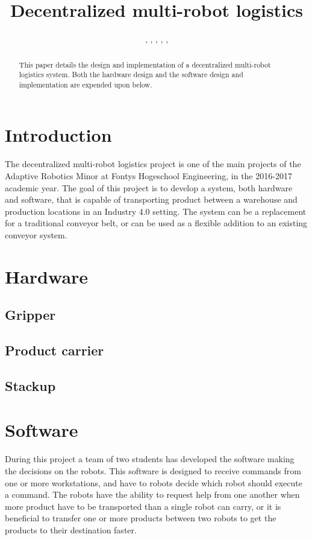 \documentclass[10pt, journal]{IEEEtran}
\author{\IEEEauthorblockN{Remco Aarts}, 
 \IEEEauthorblockN{Jeroen van den Akker}, 
 \IEEEauthorblockN{Robert Delmaar}, 
 \IEEEauthorblockN{Bas Janssen},
 \IEEEauthorblockN{Addie Perenboom},
 \IEEEauthorblockN{Dimitri Waard}}
\title{Decentralized multi-robot logistics}
\begin{document}
\maketitle

\begin{abstract}
This paper details the design and implementation of a decentralized multi-robot logistics system. Both the hardware design and the software design and implementation are expended upon below.
\end{abstract}
\begin{IEEEkeywords}

\end{IEEEkeywords}

\section{Introduction}
The decentralized multi-robot logistics project is one of the main projects of the Adaptive Robotics Minor at Fontys Hogeschool Engineering, in the 2016-2017 academic year. The goal of this project is to develop a system, both hardware and software, that is capable of transporting product between a warehouse and production locations in an Industry 4.0 setting. The system can be a replacement for a traditional conveyor belt, or can be used as a flexible addition to an existing conveyor system.

\section{Hardware}

\subsection{Gripper}
\lipsum[4]

\subsection{Product carrier}
\lipsum[5]

\subsection{Stackup}
\lipsum[7-8]

\section{Software}
During this project a team of two students has developed the software making the decisions on the robots. This software is designed to receive commands from one or more workstations, and have to robots decide which robot should execute a command. The robots have the ability to request help from one another when more product have to be transported than a single robot can carry, or it is beneficial to transfer one or more products between two robots to get the products to their destination faster.
\end{document}
